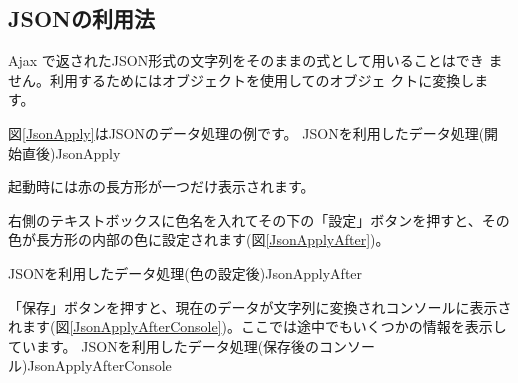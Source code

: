 \subsection{JSONの利用法}
Ajax で返されたJSON形式の文字列をそのまま\JS の式として用いることはでき
ません。利用するためにはオブジェクトを使用して\JS のオブジェ
クトに変換します。

図\ref{JsonApply}はJSONのデータ処理の例です。
{JSONを利用したデータ処理(開始直後)}{JsonApply} 

起動時には赤の長方形が一つだけ表示されます。

右側のテキストボックスに色名を入れてその下の「設定」ボタンを押すと、その
色が長方形の内部の色に設定されます(図\ref{JsonApplyAfter})。

{JSONを利用したデータ処理(色の設定後)}{JsonApplyAfter} 

「保存」ボタンを押すと、現在のデータが文字列に変換されコンソールに表示さ
れます(図\ref{JsonApplyAfterConsole})。ここでは途中でもいくつかの情報を表示しています。
{JSONを利用したデータ処理(保存後のコンソール)}{JsonApplyAfterConsole} 

